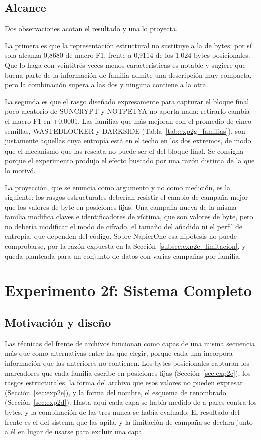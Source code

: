 \subsection{Alcance}

Dos observaciones acotan el resultado y una lo proyecta.

La primera es que la representación estructural no sustituye a la de bytes: por sí sola alcanza 0,8680 de macro-F1, frente a 0,9114 de los 1.024 bytes posicionales. Que lo haga con veintitrés veces menos características es notable y sugiere que buena parte de la información de familia admite una descripción muy compacta, pero la combinación supera a las dos y ninguna contiene a la otra.

La segunda es que el rasgo diseñado expresamente para capturar el bloque final poco aleatorio de SUNCRYPT y NOTPETYA no aporta nada: retirarlo cambia el macro-F1 en +0,0001. Las familias que más mejoran con el promedio de cinco semillas, WASTEDLOCKER y DARKSIDE (Tabla~\ref{tab:exp2g_familias}), son justamente aquellas cuya entropía está en el techo en los dos extremos, de modo que el mecanismo que las rescata no puede ser el del bloque final. Se consigna porque el experimento produjo el efecto buscado por una razón distinta de la que lo motivó.

La proyección, que se enuncia como argumento y no como medición, es la siguiente: los rasgos estructurales deberían resistir el cambio de campaña mejor que los valores de byte en posiciones fijas. Una campaña nueva de la misma familia modifica claves e identificadores de víctima, que son valores de byte, pero no debería modificar el modo de cifrado, el tamaño del añadido ni el perfil de entropía, que dependen del código. Sobre NapierOne esa hipótesis no puede comprobarse, por la razón expuesta en la Sección~\ref{subsec:exp2c_limitacion}, y queda planteada para un conjunto de datos con varias campañas por familia.

\section{Experimento 2f: Sistema Completo}
\label{sec:exp2f}

\subsection{Motivación y diseño}

Las técnicas del frente de archivos funcionan como capas de una misma secuencia más que como alternativas entre las que elegir, porque cada una incorpora información que las anteriores no contienen. Los bytes posicionales capturan los marcadores que cada familia escribe en posiciones fijas (Sección~\ref{sec:exp2c}); los rasgos estructurales, la forma del archivo que esos valores no pueden expresar (Sección~\ref{sec:exp2e}), y la forma del nombre, el esquema de renombrado (Sección~\ref{sec:exp2d}). Hasta aquí cada capa se había medido de a pares contra los bytes, y la combinación de las tres nunca se había evaluado. El resultado del frente es el del sistema que las apila, y la limitación de campaña se declara junto a él en lugar de usarse para excluir una capa.

